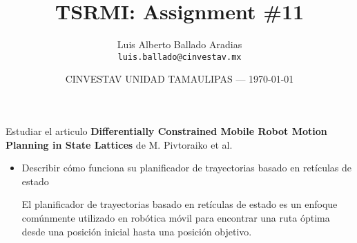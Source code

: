 \documentclass{article}
\title{TSRMI: Assignment \#11} %
\author{Luis Alberto Ballado Aradias\\ \texttt{luis.ballado@cinvestav.mx}} %
\date{CINVESTAV UNIDAD TAMAULIPAS --- \today} %
\begin{document}
\maketitle %


Estudiar el articulo \textbf{Differentially Constrained Mobile Robot Motion Planning in State Lattices} de M. Pivtoraiko et al.\\

\begin{itemize}
\item Describir cómo funciona su planificador de trayectorias basado en retículas de estado

  El planificador de trayectorias basado en retículas de estado es un enfoque comúnmente utilizado en robótica móvil para encontrar una ruta óptima desde una posición inicial hasta una posición objetivo. 


\end{itemize}
\end{document}
